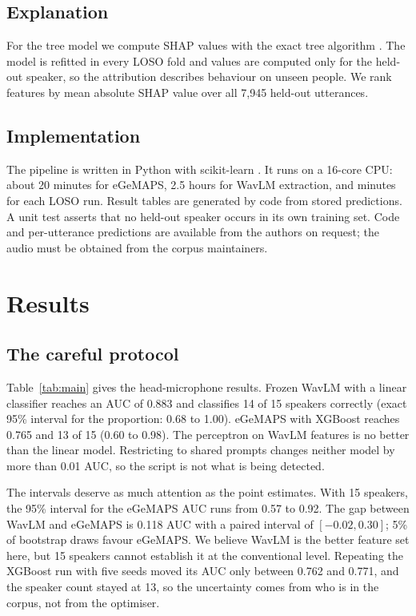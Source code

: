 \documentclass[conference]{IEEEtran}
\begin{document}
\subsection{Explanation}
For the tree model we compute SHAP values with the exact tree algorithm \cite{lundberg2017,lundberg2020}. The model is refitted in every LOSO fold and values are computed only for the held-out speaker, so the attribution describes behaviour on unseen people. We rank features by mean absolute SHAP value over all 7,945 held-out utterances.

\subsection{Implementation}
The pipeline is written in Python with scikit-learn \cite{pedregosa2011}. It runs on a 16-core CPU: about 20 minutes for eGeMAPS, 2.5 hours for WavLM extraction, and minutes for each LOSO run. Result tables are generated by code from stored predictions. A unit test asserts that no held-out speaker occurs in its own training set. Code and per-utterance predictions are available from the authors on request; the audio must be obtained from the corpus maintainers.

\section{Results}
\subsection{The careful protocol}
Table~\ref{tab:main} gives the head-microphone results. Frozen WavLM with a linear classifier reaches an AUC of 0.883 and classifies 14 of 15 speakers correctly (exact 95\% interval for the proportion: 0.68 to 1.00). eGeMAPS with XGBoost reaches 0.765 and 13 of 15 (0.60 to 0.98). The perceptron on WavLM features is no better than the linear model. Restricting to shared prompts changes neither model by more than 0.01 AUC, so the script is not what is being detected.

The intervals deserve as much attention as the point estimates. With 15 speakers, the 95\% interval for the eGeMAPS AUC runs from 0.57 to 0.92. The gap between WavLM and eGeMAPS is 0.118 AUC with a paired interval of $[-0.02, 0.30]$; 5\% of bootstrap draws favour eGeMAPS. We believe WavLM is the better feature set here, but 15 speakers cannot establish it at the conventional level. Repeating the XGBoost run with five seeds moved its AUC only between 0.762 and 0.771, and the speaker count stayed at 13, so the uncertainty comes from who is in the corpus, not from the optimiser.
\end{document}
